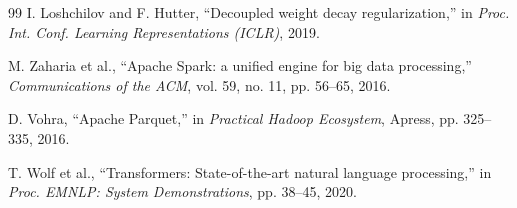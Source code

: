 \begin{thebibliography}{99}
I. Loshchilov and F. Hutter,
``Decoupled weight decay regularization,''
in \textit{Proc. Int. Conf. Learning Representations (ICLR)}, 2019.

M. Zaharia et al.,
``Apache Spark: a unified engine for big data processing,''
\textit{Communications of the ACM}, vol. 59, no. 11, pp. 56--65, 2016.

D. Vohra,
``Apache Parquet,'' in \textit{Practical Hadoop Ecosystem},
Apress, pp. 325--335, 2016.

T. Wolf et al.,
``Transformers: State-of-the-art natural language processing,''
in \textit{Proc. EMNLP: System Demonstrations}, pp. 38--45, 2020.

\end{thebibliography}
